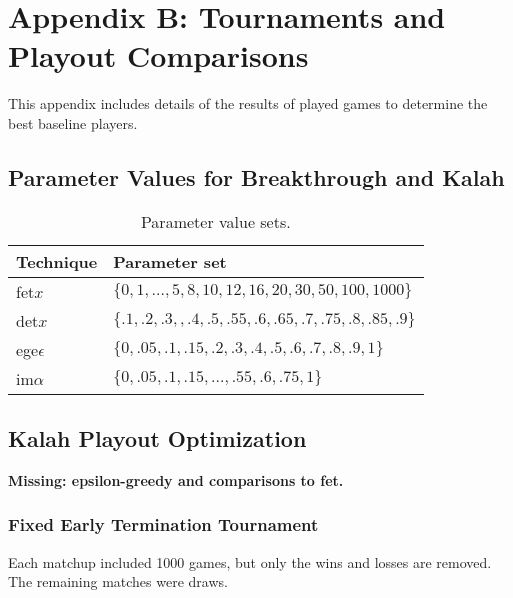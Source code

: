 \documentclass{article}
\begin{document}
\section{Appendix B: Tournaments and Playout Comparisons}

This appendix includes details of the results of played games to determine the best baseline players. 

\subsection{Parameter Values for Breakthrough and Kalah}

\begin{table}[h!]
\begin{center}
\begin{tabular}{|l|l|}
\hline
Technique & Parameter set \\
\hline
fet$x$          & $\{ 0, 1, \ldots, 5, 8, 10, 12, 16, 20, 30, 50, 100, 1000 \}$ \\
det$x$         & $\{ .1, .2, .3, , .4, .5, .55, .6, .65, .7, .75, .8, .85, .9 \}$ \\
ege$\epsilon$  & $\{ 0, .05, .1, .15, .2, .3, .4, .5, .6, .7, .8, .9, 1 \}$ \\
im$\alpha$     & $\{ 0, .05, .1, .15, \ldots, .55, .6, .75, 1 \}$ \\
\hline
\end{tabular}
\end{center}
\caption{Parameter value sets.}
\label{tbl:parmsets}
\end{table}

\subsection{Kalah Playout Optimization}

{\bf {\color{red} Missing: epsilon-greedy and comparisons to fet.}}

\subsubsection{Fixed Early Termination Tournament}

Each matchup included 1000 games, but only the wins and losses are removed. The remaining
matches were draws. 
\end{document}
